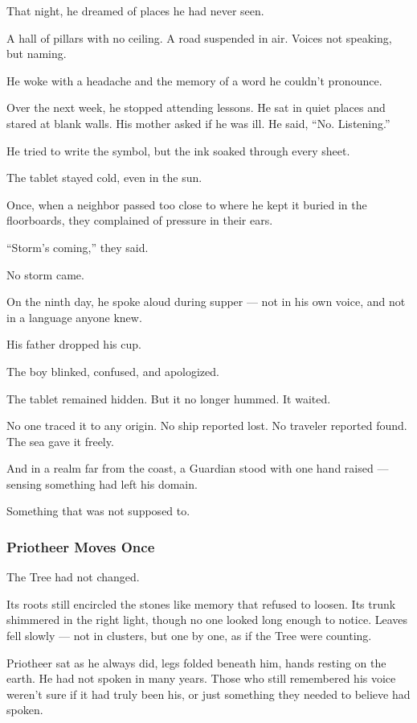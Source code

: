 \documentclass[12pt]{article}
\begin{document}
That night, he dreamed of places he had never seen.

A hall of pillars with no ceiling. A road suspended in air. Voices not speaking, but naming.

He woke with a headache and the memory of a word he couldn’t pronounce.

Over the next week, he stopped attending lessons. He sat in quiet places and stared at blank walls. His mother asked if he was ill. He said, ``No. Listening.''

He tried to write the symbol, but the ink soaked through every sheet.

The tablet stayed cold, even in the sun.

Once, when a neighbor passed too close to where he kept it buried in the floorboards, they complained of pressure in their ears.

``Storm’s coming,'' they said.

No storm came.

On the ninth day, he spoke aloud during supper — not in his own voice, and not in a language anyone knew.

His father dropped his cup.

The boy blinked, confused, and apologized.

The tablet remained hidden. But it no longer hummed. It waited.

No one traced it to any origin. No ship reported lost. No traveler reported found. The sea gave it freely.

And in a realm far from the coast, a Guardian stood with one hand raised — sensing something had left his domain.

Something that was not supposed to.


\dotfill

\subsubsection*{Priotheer Moves Once}

The Tree had not changed.

Its roots still encircled the stones like memory that refused to loosen. Its trunk shimmered in the right light, though no one looked long enough to notice. Leaves fell slowly — not in clusters, but one by one, as if the Tree were counting.

Priotheer sat as he always did, legs folded beneath him, hands resting on the earth. He had not spoken in many years. Those who still remembered his voice weren’t sure if it had truly been his, or just something they needed to believe had spoken.
\end{document}
